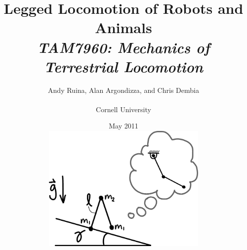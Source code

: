 \documentclass[normalsize]{book}
\begin{document}




\title{Legged Locomotion of Robots and Animals\\\textit{\large{TAM7960: Mechanics of Terrestrial Locomotion}}}
\author{Andy Ruina, Alan Argondizza, and Chris Dembia\\\\Cornell University}
\date{May 2011 \\ \vspace{1in} \includegraphics[width=0.6\textwidth]{Figures/SimplestWalkerPendulum} }


\maketitle



\tableofcontents
\listoffigures











\end{document}

